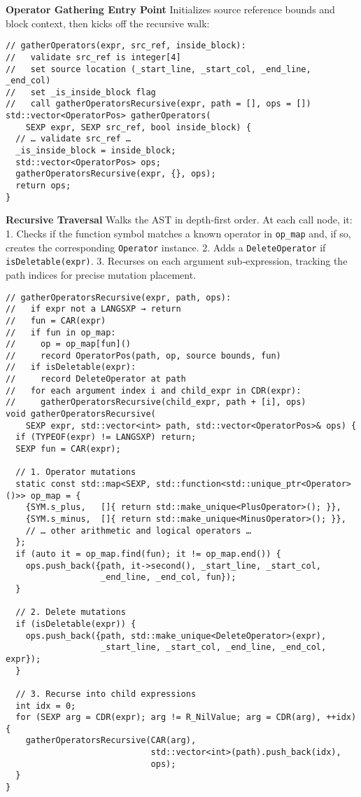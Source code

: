 \medskip
\noindent\textbf{Operator Gathering Entry Point}  
Initializes source reference bounds and block context, then kicks off the recursive walk:

\begin{verbatim}
// gatherOperators(expr, src_ref, inside_block):
//   validate src_ref is integer[4]
//   set source location (_start_line, _start_col, _end_line, _end_col)
//   set _is_inside_block flag
//   call gatherOperatorsRecursive(expr, path = [], ops = [])
std::vector<OperatorPos> gatherOperators(
    SEXP expr, SEXP src_ref, bool inside_block) {
  // … validate src_ref …
  _is_inside_block = inside_block;
  std::vector<OperatorPos> ops;
  gatherOperatorsRecursive(expr, {}, ops);
  return ops;
}
\end{verbatim}

\medskip
\noindent\textbf{Recursive Traversal}  
Walks the AST in depth‐first order.  At each call node, it:
1. Checks if the function symbol matches a known operator in \texttt{op\_map} and, if so, creates the corresponding \texttt{Operator} instance.  
2. Adds a \texttt{DeleteOperator} if \texttt{isDeletable(expr)}.  
3. Recurses on each argument sub‐expression, tracking the path indices for precise mutation placement.

\begin{verbatim}
// gatherOperatorsRecursive(expr, path, ops):
//   if expr not a LANGSXP → return
//   fun = CAR(expr)
//   if fun in op_map:
//     op = op_map[fun]()
//     record OperatorPos(path, op, source bounds, fun)
//   if isDeletable(expr):
//     record DeleteOperator at path
//   for each argument index i and child_expr in CDR(expr):
//     gatherOperatorsRecursive(child_expr, path + [i], ops)
void gatherOperatorsRecursive(
    SEXP expr, std::vector<int> path, std::vector<OperatorPos>& ops) {
  if (TYPEOF(expr) != LANGSXP) return;
  SEXP fun = CAR(expr);

  // 1. Operator mutations
  static const std::map<SEXP, std::function<std::unique_ptr<Operator>()>> op_map = {
    {SYM.s_plus,   []{ return std::make_unique<PlusOperator>(); }},
    {SYM.s_minus,  []{ return std::make_unique<MinusOperator>(); }},
    // … other arithmetic and logical operators …
  };
  if (auto it = op_map.find(fun); it != op_map.end()) {
    ops.push_back({path, it->second(), _start_line, _start_col,
                   _end_line, _end_col, fun});
  }

  // 2. Delete mutations
  if (isDeletable(expr)) {
    ops.push_back({path, std::make_unique<DeleteOperator>(expr),
                   _start_line, _start_col, _end_line, _end_col, expr});
  }

  // 3. Recurse into child expressions
  int idx = 0;
  for (SEXP arg = CDR(expr); arg != R_NilValue; arg = CDR(arg), ++idx) {
    gatherOperatorsRecursive(CAR(arg), 
                             std::vector<int>(path).push_back(idx), 
                             ops);
  }
}
\end{verbatim}

